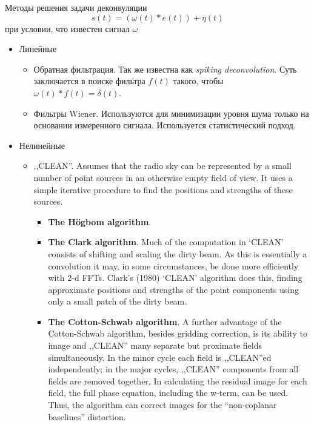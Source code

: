 \documentclass[a4paper,12pt,notitlepage,headsepline,pdftex]{scrartcl}
\begin{document}
  Методы решения задачи деконвуляции
  \begin{equation}
    s(t) = \left( \omega(t) * e(t) \right) + \eta(t)
    \label{eq:convulation}
  \end{equation}
  при условии, что известен сигнал $\omega$
  \begin{itemize}
    \item Линейные
      \begin{itemize}
        \item Обратная фильтрация.
          Так же известна как \textit{spiking deconvolution}.
          Суть заключается в поиске фильтра $f(t)$ такого, чтобы $\omega(t) *
          f(t) = \delta(t)$.
        \item Фильтры Wiener.
          Используются для минимизации уровня шума только на основании
          измеренного сигнала.
          Используется статистический подход.
      \end{itemize}
    \item Нелинейные
      \begin{itemize}
        \item ,,CLEAN''.
          Assumes that the radio sky can be represented by a small number of
          point sources in an otherwise empty field of view.
          It uses a simple iterative procedure to find the positions and
          strengths of these sources.
          \begin{itemize}
            \item \textbf{The H\"{o}gbom algorithm}.
            \item \textbf{The Clark algorithm}.
              Much of the computation in `CLEAN' consists of shifting and
              scaling the dirty beam.
              As this is essentially a convolution it may, in some
              circumstances, be done more efficiently with 2-d FFTs.
              Clark's (1980) `CLEAN' algorithm does this, finding approximate
              positions and strengths of the point components using only a
              small patch of the dirty beam.
            \item \textbf{The Cotton-Schwab algorithm}.
              A further advantage of the Cotton-Schwab algorithm, besides
              gridding correction, is its ability to image and ,,CLEAN'' many
              separate but proximate fields simultaneously.
              In the minor cycle each field is ,,CLEAN''ed independently; in
              the major cycles, ,,CLEAN'' components from all fields are
              removed together.
              In calculating the residual image for each field, the full phase
              equation, including the w-term, can be used.
              Thus, the algorithm can correct images for the ``non-coplanar
              baselines'' distortion.


\end{itemize}
\end{itemize}
\end{itemize}
\end{document}
